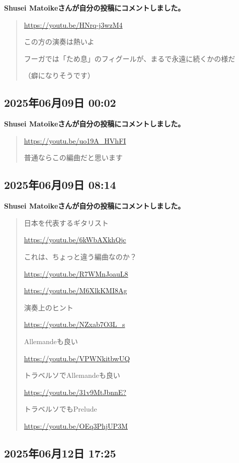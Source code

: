 \textbf{Shusei Matoikeさんが自分の投稿にコメントしました。}

\begin{quote}
\url{https://youtu.be/HNrq-j3wzM4}

この方の演奏は熱いよ

フーガでは「ため息」のフィグールが、まるで永遠に続くかの様だ

（癖になりそうです）
\end{quote}

\subsection*{2025年06月09日 00:02}

\textbf{Shusei Matoikeさんが自分の投稿にコメントしました。}

\begin{quote}
\url{https://youtu.be/uo19A_HVhFI}

普通ならこの編曲だと思います
\end{quote}

\subsection*{2025年06月09日 08:14}

\textbf{Shusei Matoikeさんが自分の投稿にコメントしました。}

\begin{quote}
日本を代表するギタリスト

\url{https://youtu.be/6kWbAXkhQjc}

これは、ちょっと違う編曲なのか？

\url{https://youtu.be/R7WMnJoauL8}

\url{https://youtu.be/M6XlkKMI8Ag}

演奏上のヒント

\url{https://youtu.be/NZxab7O3L_s}

Allemandeも良い

\url{https://youtu.be/VPWNkitbwUQ}

トラベルソでAllemandeも良い

\url{https://youtu.be/31v9MtJbnnE?}

トラベルソでもPrelude

\url{https://youtu.be/OEq3PhjUP3M}
\end{quote}

\subsection*{2025年06月12日 17:25}


